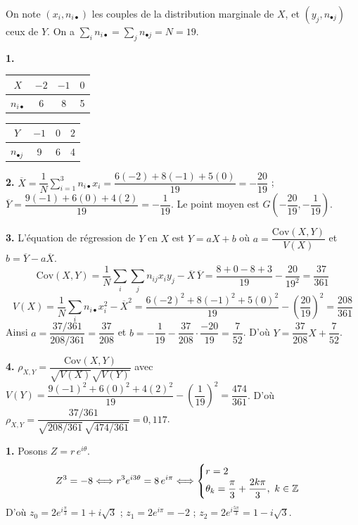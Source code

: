 \documentclass[11pt]{article}
\begin{document}

On note $(x_i, n_{i\bullet})$ les couples de la distribution marginale de $X$, et $(y_j, n_{\bullet j})$ ceux de $Y$. On a $\sum_i n_{i\bullet} = \sum_j n_{\bullet j} = N = 19$.

\textbf{1.}
\begin{center}\renewcommand{\arraystretch}{1.3}
\begin{tabular}{|c|c|c|c|}\hline $X$ & $-2$ & $-1$ & $0$ \\\hline $n_{i\bullet}$ & 6 & 8 & 5 \\\hline\end{tabular}\qquad
\begin{tabular}{|c|c|c|c|}\hline $Y$ & $-1$ & $0$ & $2$ \\\hline $n_{\bullet j}$ & 9 & 6 & 4 \\\hline\end{tabular}
\end{center}

\textbf{2.} $\overline{X} = \dfrac{1}{N}\sum_{i=1}^3 n_{i\bullet}x_i = \dfrac{6(-2) + 8(-1) + 5(0)}{19} = -\dfrac{20}{19}$ ; \quad $\overline{Y} = \dfrac{9(-1) + 6(0) + 4(2)}{19} = -\dfrac{1}{19}$. Le point moyen est $G\left(-\dfrac{20}{19}, -\dfrac{1}{19}\right)$.

\textbf{3.} L'équation de régression de $Y$ en $X$ est $Y = aX + b$ où $a = \dfrac{\mathrm{Cov}(X,Y)}{V(X)}$ et $b = \overline{Y} - a\overline{X}$.
\[ \mathrm{Cov}(X,Y) = \frac{1}{N}\sum_{i}\sum_{j} n_{ij}x_i y_j - \overline{X}\,\overline{Y} = \frac{8 + 0 - 8 + 3}{19} - \frac{20}{19^2} = \frac{37}{361} \]
\[ V(X) = \frac{1}{N}\sum_i n_{i\bullet}x_i^2 - \overline{X}^2 = \frac{6(-2)^2 + 8(-1)^2 + 5(0)^2}{19} - \left(\frac{20}{19}\right)^2 = \frac{208}{361} \]
Ainsi $a = \dfrac{37/361}{208/361} = \dfrac{37}{208}$ et $b = -\dfrac{1}{19} - \dfrac{37}{208}\cdot\dfrac{-20}{19} = \dfrac{7}{52}$. D'où $Y = \dfrac{37}{208}X + \dfrac{7}{52}$.

\textbf{4.} $\rho_{X,Y} = \dfrac{\mathrm{Cov}(X,Y)}{\sqrt{V(X)}\sqrt{V(Y)}}$ avec $V(Y) = \dfrac{9(-1)^2 + 6(0)^2 + 4(2)^2}{19} - \left(\dfrac{1}{19}\right)^2 = \dfrac{474}{361}$. D'où $\rho_{X,Y} = \dfrac{37/361}{\sqrt{208/361}\,\sqrt{474/361}} = 0{,}117$.

\textbf{1.} Posons $Z = r\,e^{i\theta}$.
\[ Z^3 = -8 \Longleftrightarrow r^3 e^{i3\theta} = 8\,e^{i\pi} \Longleftrightarrow \begin{cases} r = 2 \\ \theta_k = \dfrac{\pi}{3} + \dfrac{2k\pi}{3},\ k \in \mathbb{Z} \end{cases} \]
D'où $z_0 = 2e^{i\frac{\pi}{3}} = 1 + i\sqrt{3}$ ; \quad $z_1 = 2e^{i\pi} = -2$ ; \quad $z_2 = 2e^{i\frac{5\pi}{3}} = 1 - i\sqrt{3}$.
\end{document}
